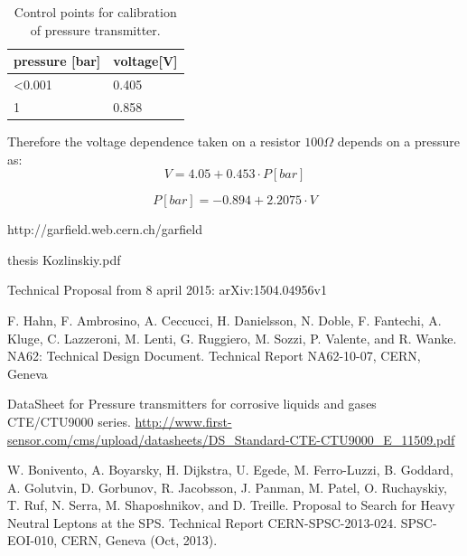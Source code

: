\documentclass[12pt,a4paper]{article}
\begin{document}
	
	
	\begin{table}[!h]
	\centering
	\caption{ Control points for calibration of pressure transmitter.}
	\begin{tabular}{|l|l|}
		\hline
		pressure [bar] & voltage[V] \\
		\hline
		<0.001 & 0.405\\
		\hline
		1 & 0.858\\
		\hline
	\end{tabular}
	\end{table}
	
	Therefore the voltage dependence taken on a resistor 	$100\Omega$ depends on a pressure as:
	\begin{equation}
	V = 4.05 + 0.453 \cdot P[bar]
	\end{equation}

	\begin{equation}	
	P[bar] = -0.894 + 2.2075 \cdot V
	\end{equation}

\newpage
\begin{thebibliography}{00}
	 http://garfield.web.cern.ch/garfield

	 thesis Kozlinskiy.pdf 
	
	 Technical Proposal from 8 april 2015: arXiv:1504.04956v1	
	
	 F. Hahn, F. Ambrosino, A. Ceccucci, H. Danielsson, N. Doble, F. Fantechi, A. Kluge, C. Lazzeroni, M. Lenti, G. Ruggiero, M. Sozzi, P. Valente, and R. Wanke. NA62: Technical Design Document. Technical Report NA62-10-07, CERN, Geneva
	
	 DataSheet for Pressure transmitters for corrosive liquids and gases CTE/CTU9000 series. \url{http://www.first-sensor.com/cms/upload/datasheets/DS_Standard-CTE-CTU9000_E_11509.pdf}
	
	 W. Bonivento, A. Boyarsky, H. Dijkstra, U. Egede, M. Ferro-Luzzi, B. Goddard, A. Golutvin, D. Gorbunov, R. Jacobsson, J. Panman, M. Patel, O. Ruchayskiy, T. Ruf, N. Serra, M. Shaposhnikov, and D. Treille. Proposal to Search for Heavy Neutral Leptons at the SPS. Technical Report CERN-SPSC-2013-024. SPSC-EOI-010, CERN, Geneva (Oct, 2013).
	
\end{thebibliography}
	
\end{document}
